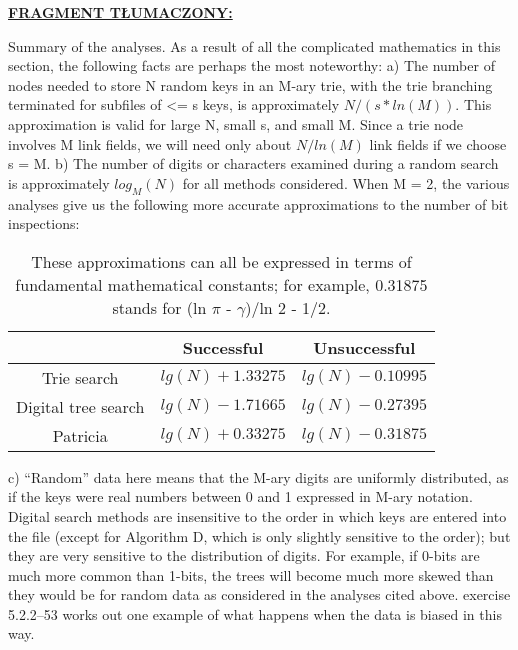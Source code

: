     \ifsourcematerial
	\begin{displayquote}
		\color{ao(english)}
		\underline{\textbf{FRAGMENT TŁUMACZONY:}} \newline
		
		Summary of the analyses. As a result of all the complicated mathematics in this section, the following facts are perhaps the most noteworthy: \newline
		a) The number of nodes needed to store N random keys in an M-ary trie,
		with the trie branching terminated for subfiles of <= s keys, is approximately $N/(s*ln(M))$. This approximation is valid for large N, small s, and small M. Since a trie node involves M link fields, we will need only about $N/ln(M)$ link fields if we choose s = M. \newline
		b) The number of digits or characters examined during a random search is
		approximately $log_M(N)$ for all methods considered. When M = 2, the various
		analyses give us the following more accurate approximations to the number of
		bit inspections:
		
		\begin{table}[H]
			\color{ao(english)}
			\centering
			\begin{threeparttable}
				\color{ao(english)}
				\caption{ \color{ao(english)}
					These approximations can all be expressed in terms of fundamental mathematical constants; for example, 0.31875 stands for (ln $\pi$ - $\gamma$)/ln 2 - 1/2.}
				
				{ \small \color{ao(english)}
					\begin{tabularx}{\textwidth}{C{7.5}|C{14}|C{14}|}
						\textbf{} 				& \textbf{Successful} 	& \textbf{Unsuccessful} \\
						\hline \hline
						Trie search 			& $lg(N)+1.33275$ 			& $lg(N)-0.10995$ \\
						Digital tree search		& $lg(N)-1.71665$			& $lg(N)-0.27395$ \\
						Patricia 				& $lg(N)+0.33275$			& $lg(N)-0.31875$ \\
					\end{tabularx} 
				}
			\end{threeparttable}
		\end{table}
		c) “Random” data here means that the M-ary digits are uniformly distributed, as if the keys were real numbers between 0 and 1 expressed in M-ary notation. Digital search methods are insensitive to the order in which keys are entered into the file (except for Algorithm D, which is only slightly sensitive to the order); but they are very sensitive to the distribution of digits. For example, if 0-bits are much more common than 1-bits, the trees will become much more skewed than they would be for random data as considered in the analyses cited above. exercise 5.2.2–53 works out one example of what happens when the data is biased in this way.	
	\end{displayquote}
	\fi
	
